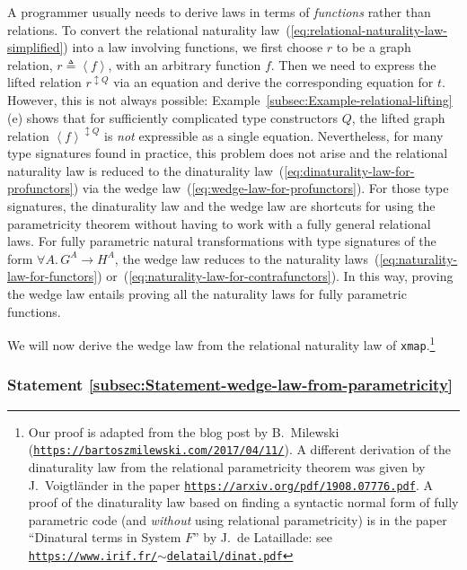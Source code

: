 A programmer usually needs to derive laws in terms of \emph{functions}
rather than relations. To convert the relational naturality law~(\ref{eq:relational-naturality-law-simplified})
into a law involving functions, we first choose $r$ to be a graph
relation, $r\triangleq\left<f\right>$, with an arbitrary function
$f$. Then we need to express the lifted relation $r^{\updownarrow Q}$
via an equation and derive the corresponding equation for $t$. However,
this is not always possible: Example~\ref{subsec:Example-relational-lifting}(e)
shows that for sufficiently complicated type constructors $Q$, the
lifted graph relation $\left<f\right>^{\updownarrow Q}$ is \emph{not}
expressible as a single equation. Nevertheless, for many type signatures
found in practice, this problem does not arise and the relational
naturality law is reduced to the dinaturality law~(\ref{eq:dinaturality-law-for-profunctors})
via the wedge law~(\ref{eq:wedge-law-for-profunctors}). For those
type signatures, the dinaturality law  and the wedge law are shortcuts
for using the parametricity theorem without having to work with a
fully general relational laws. For fully parametric natural transformations
with type signatures of the form $\forall A.\,G^{A}\rightarrow H^{A}$,
the wedge law reduces to the naturality laws~(\ref{eq:naturality-law-for-functors})
or~(\ref{eq:naturality-law-for-contrafunctors}). In this way, proving
the wedge law entails proving all the naturality laws for fully parametric
functions.

We will now derive the wedge law from the relational naturality law
of \lstinline!xmap!.\footnote{Our proof is adapted from the blog post by B.~Milewski
(\texttt{\href{https://bartoszmilewski.com/2017/04/11/}{https://bartoszmilewski.com/2017/04/11/}}).
A different derivation of the dinaturality law from the relational
parametricity theorem was given by J.~Voigtl\"ander
in the paper \texttt{\href{https://arxiv.org/pdf/1908.07776.pdf}{https://arxiv.org/pdf/1908.07776.pdf}}.
A proof of the dinaturality law based on finding a syntactic normal
form of fully parametric code (and \emph{without} using relational
 parametricity) is in the paper \textsf{``}Dinatural terms in System $F$\textsf{''}
by J.~de Lataillade: see \texttt{\href{https://www.irif.fr/~delatail/dinat.pdf}{https://www.irif.fr/$\sim$delatail/dinat.pdf}}} 

\subsubsection{Statement \label{subsec:Statement-wedge-law-from-parametricity}\ref{subsec:Statement-wedge-law-from-parametricity}}

